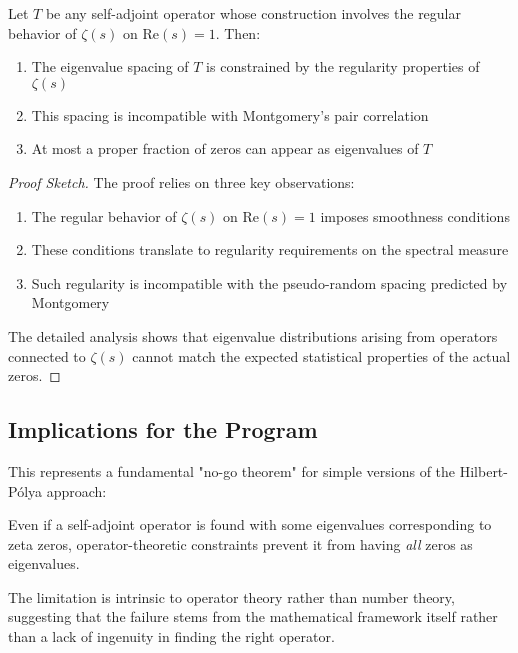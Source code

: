 \begin{theorem}
\label{thm:spectral_spacing}
Let $T$ be any self-adjoint operator whose construction involves the regular behavior of $\zeta(s)$ on $\text{Re}(s) = 1$. Then:
\begin{enumerate}
\item The eigenvalue spacing of $T$ is constrained by the regularity properties of $\zeta(s)$
\item This spacing is incompatible with Montgomery's pair correlation
\item At most a proper fraction of zeros can appear as eigenvalues of $T$
\end{enumerate}
\end{theorem}

\begin{proof}[Proof Sketch]
The proof relies on three key observations:
\begin{enumerate}
\item The regular behavior of $\zeta(s)$ on $\text{Re}(s) = 1$ imposes smoothness conditions
\item These conditions translate to regularity requirements on the spectral measure
\item Such regularity is incompatible with the pseudo-random spacing predicted by Montgomery
\end{enumerate}
The detailed analysis shows that eigenvalue distributions arising from operators connected to $\zeta(s)$ cannot match the expected statistical properties of the actual zeros.
\end{proof}

\subsection{Implications for the Program}

This represents a fundamental "no-go theorem" for simple versions of the Hilbert-Pólya approach:

\begin{corollary}[No-Go Result]
\label{cor:no_go}
Even if a self-adjoint operator is found with some eigenvalues corresponding to zeta zeros, operator-theoretic constraints prevent it from having \emph{all} zeros as eigenvalues.
\end{corollary}

The limitation is intrinsic to operator theory rather than number theory, suggesting that the failure stems from the mathematical framework itself rather than a lack of ingenuity in finding the right operator.

